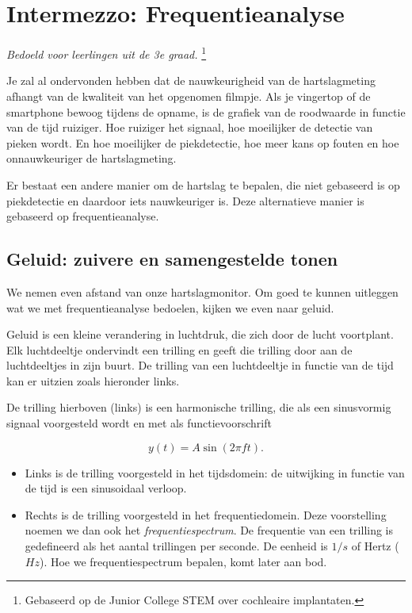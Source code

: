 \section{Intermezzo: Frequentieanalyse}
\label{sec:Mod4_Sec3}
%
\emph{Bedoeld voor leerlingen uit de 3e graad.}
\footnote{Gebaseerd op de Junior College STEM over cochleaire implantaten.}

Je zal al ondervonden hebben dat de nauwkeurigheid van de hartslagmeting afhangt van de kwaliteit van het opgenomen filmpje. Als je vingertop of de smartphone bewoog tijdens de opname, is de grafiek van de roodwaarde in functie van de tijd ruiziger. Hoe ruiziger het signaal, hoe moeilijker de detectie van pieken wordt. En hoe moeilijker de piekdetectie, hoe meer kans op fouten en hoe onnauwkeuriger de hartslagmeting.

Er bestaat een andere manier om de hartslag te bepalen, die niet gebaseerd is op piekdetectie en daardoor iets nauwkeuriger is. Deze alternatieve manier is gebaseerd op frequentieanalyse.

\subsection{Geluid: zuivere en samengestelde tonen}

We nemen even afstand van onze hartslagmonitor. Om goed te kunnen uitleggen wat we met frequentieanalyse bedoelen, kijken we even naar geluid.

Geluid is een kleine verandering in luchtdruk, die zich door de lucht voortplant. Elk luchtdeeltje ondervindt een trilling en geeft die trilling door aan de luchtdeeltjes in zijn buurt. De trilling van een luchtdeeltje in functie van de tijd kan er uitzien zoals hieronder links.


De trilling hierboven (links) is een harmonische trilling, die als een sinusvormig signaal voorgesteld wordt en met als functievoorschrift 

\begin{equation*}
y(t) = A \sin(2\pi f t).
\end{equation*}

\begin{itemize}
	\item Links is de trilling voorgesteld in het tijdsdomein: de uitwijking in functie van de tijd is een sinusoidaal verloop. 
	\item Rechts is de trilling voorgesteld in het frequentiedomein. Deze voorstelling noemen we dan ook het \emph{frequentiespectrum}. De frequentie van een trilling is gedefineerd als het aantal trillingen per seconde. De eenheid is $1/s$ of Hertz ($Hz$). Hoe we frequentiespectrum  bepalen, komt later aan bod.
\end{itemize}

